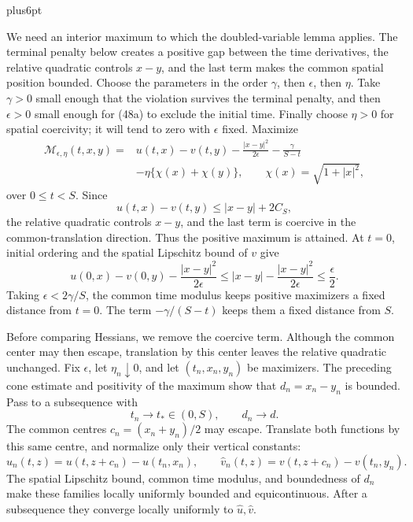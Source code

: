 \documentclass[11pt,reqno]{amsart}
\makeatletter
\theoremstyle{plain}
\theoremstyle{definition}
\theoremstyle{remark}
\renewenvironment{proof}[1][\proofname]{%
  \par
  \pushQED{\qed}%
  \normalfont
  \topsep6pt plus6pt\relax
  \trivlist
  \item[\hskip\labelsep\slshape #1\@addpunct{.}]%
  \ignorespaces
}{%
  \popQED
  \endtrivlist
  \@endpefalse
}
\DeclareRobustCommand{\qed}{%
  \leavevmode\unskip\penalty9999\hbox{}\nobreak
  \ifmmode
    \makebox[0pt][l]{\qquad\hbox{\qedsymbol}}%
  \else
    \qquad\hbox{\qedsymbol}%
  \fi
}
\renewcommand{\qedsymbol}{\rule[.47pt]{4pt}{6pt}}
\numberwithin{equation}{section}
\newcommand{\1}{\mathbf 1}
\makeatother
\begin{document}
\begin{proof}
We need an interior maximum to which the doubled-variable lemma
applies.  The terminal penalty below creates a positive gap between
the time derivatives, the relative quadratic controls $x-y$, and the
last term makes the common spatial position bounded.
Choose the parameters in the order $\gamma$, then $\epsilon$, then
$\eta$.  Take $\gamma>0$ small enough that the violation survives
the terminal penalty, and then $\epsilon>0$ small enough for (48a)
to exclude the initial time.  Finally choose $\eta>0$ for spatial
coercivity; it will tend to zero with $\epsilon$ fixed.  Maximize
\begin{equation}
\begin{split}
\mathcal M_ {\epsilon,\eta}(t,x,y)
={}&u(t,x)-v(t,y)-\frac{|x-y|^2}{2\epsilon}
-\frac{\gamma}{S-t}\\
&-\eta\{\chi(x)+\chi(y)\},\qquad
\chi(x)=\sqrt{1+|x|^2},                                  
\end{split}
\tag{48}
\end{equation}
over $0\leq t<S$.  Since
\begin{equation*}
u(t,x)-v(t,y)\leq |x-y|+2C_ S,
\end{equation*}
the relative quadratic controls $x-y$, and the last term is
coercive in the common-translation direction.  Thus the positive
maximum is attained.  At $t=0$, initial ordering and the spatial
Lipschitz bound of $v$ give
\begin{equation}
u(0,x)-v(0,y)-\frac{|x-y|^2}{2\epsilon}
\leq |x-y|-\frac{|x-y|^2}{2\epsilon}\leq\frac\epsilon2.
\tag{48a}
\end{equation}
Taking $\epsilon<2\gamma/S$, the common time modulus keeps positive
maximizers a fixed distance from $t=0$.  The term
$-\gamma/(S-t)$ keeps them a fixed distance from $S$.

Before comparing Hessians, we remove the coercive term.  Although
the common center may then escape, translation by this center leaves
the relative quadratic unchanged.  Fix $\epsilon$, let
$\eta_n\downarrow0$, and let
$(t_ n,x_ n,y_ n)$ be maximizers.  The preceding cone estimate and
positivity of the maximum show that $d_ n=x_ n-y_ n$ is bounded.  Pass
to a subsequence with
\begin{equation*}
t_ n\to t_ *\in(0,S),\qquad d_ n\to d.
\end{equation*}
The common centres $c_ n=(x_ n+y_ n)/2$ may escape.  Translate both
functions by this same centre, and normalize only their vertical
constants:
\begin{equation}
\widehat u_ n(t,z)=u(t,z+c_ n)-u(t_ n,x_ n),\qquad
\widehat v_ n(t,z)=v(t,z+c_ n)-v(t_ n,y_ n).
\tag{48b}
\end{equation}
The spatial Lipschitz bound, common time modulus, and boundedness of
$d_ n$ make these families locally uniformly bounded and
equicontinuous.  After a subsequence they converge locally uniformly
to $\widehat u,\widehat v$.


\end{proof}
\end{document}
